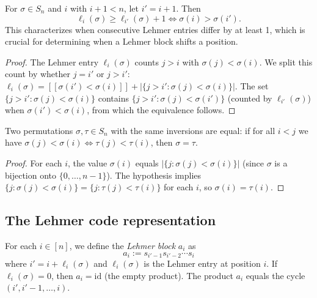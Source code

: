 \begin{lemma}
\label{lem.perm.lehmerEntry_diff_iff_inversion}
\leanhelper
\leanok
For $\sigma \in S_n$ and $i$ with $i + 1 < n$, let $i' = i + 1$. Then
\[
\ell_i(\sigma) \geq \ell_{i'}(\sigma) + 1 \iff \sigma(i) > \sigma(i').
\]
This characterizes when consecutive Lehmer entries differ by at least 1,
which is crucial for determining when a Lehmer block shifts a position.
\end{lemma}

\begin{proof}
The Lehmer entry $\ell_i(\sigma)$ counts $j > i$ with $\sigma(j) < \sigma(i)$.
We split this count by whether $j = i'$ or $j > i'$:
$\ell_i(\sigma) = [[\sigma(i') < \sigma(i)]] + |\{j > i' : \sigma(j) < \sigma(i)\}|$.
The set $\{j > i' : \sigma(j) < \sigma(i)\}$ contains
$\{j > i' : \sigma(j) < \sigma(i')\}$ (counted by $\ell_{i'}(\sigma)$)
when $\sigma(i') < \sigma(i)$, from which the equivalence follows.
\end{proof}

\begin{lemma}
\label{lem.perm.eq_of_inversions_eq}
\leanhelper
\leanok
Two permutations $\sigma, \tau \in S_n$ with the same inversions are equal:
if for all $i < j$ we have $\sigma(j) < \sigma(i) \iff \tau(j) < \tau(i)$,
then $\sigma = \tau$.
\end{lemma}

\begin{proof}
\leanok
For each $i$, the value $\sigma(i)$ equals $|\{j : \sigma(j) < \sigma(i)\}|$
(since $\sigma$ is a bijection onto $\{0, \ldots, n-1\}$).
The hypothesis implies $\{j : \sigma(j) < \sigma(i)\} = \{j : \tau(j) < \tau(i)\}$
for each $i$, so $\sigma(i) = \tau(i)$.
\end{proof}

\subsection{The Lehmer code representation}

\begin{definition}
\label{def.perm.lehmerBlock}
\leanhelper
\leanok
For each $i \in [n]$, we define the \emph{Lehmer block} $a_i$ as
\[
a_i := s_{i'-1} s_{i'-2} \cdots s_i
\]
where $i' = i + \ell_i(\sigma)$ and $\ell_i(\sigma)$ is the Lehmer entry at position $i$.
If $\ell_i(\sigma) = 0$, then $a_i = \mathrm{id}$ (the empty product).
The product $a_i$ equals the cycle $(i', i'-1, \ldots, i)$.
\end{definition}

